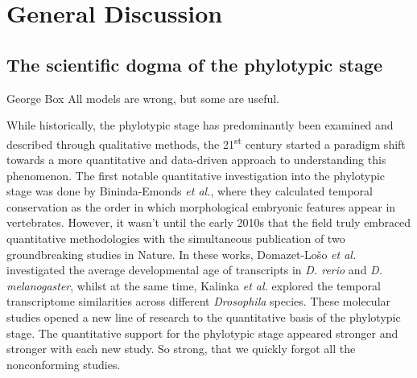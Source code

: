 \chapter{General Discussion}\thumbforchapter
\newpage

\section{The scientific dogma of the phylotypic stage}

\begin{shadequote}[c]{George Box}
All models are wrong, but some are useful.
\end{shadequote}

While historically, the phylotypic stage has predominantly been examined and described through qualitative methods, the 21\textsuperscript{st} century started a paradigm shift towards a more quantitative and data-driven approach to understanding this phenomenon\cite{Chan2021}. The first notable quantitative investigation into the phylotypic stage was done by Bininda-Emonds \textit{et al.}, where they calculated temporal conservation as the order in which morphological embryonic features appear in vertebrates\cite{OlafRP2003}. However, it wasn't until the early 2010s that the field truly embraced quantitative methodologies with the simultaneous publication of two groundbreaking studies in Nature\cite{Kalinka2010, DomazetLoso2010}. In these works, Domazet-Lošo \textit{et al.} investigated the average developmental age of transcripts in \textit{D. rerio} and \textit{D. melanogaster}, whilst at the same time, Kalinka \textit{et al.} explored the temporal transcriptome similarities across different \textit{Drosophila} species. These molecular studies opened a new line of research to the quantitative basis of the phylotypic stage. The quantitative support for the phylotypic stage appeared stronger and stronger with each new study. So strong, that we quickly forgot all the nonconforming studies.

